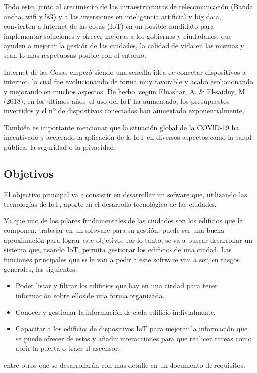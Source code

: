 \documentclass[12pt, a4paper, twoside]{article}
\begin{document}
Todo esto, junto al crecimiento de las infraestructuras de telecomuncación (Banda ancha, wifi y 5G)
y a las inversiones en inteligencia artificial y big data, convierten  a Internet de las cosas (IoT)
 en un posible candidato para implementar soluciones y ofrecer mejoras a los gobiernos y ciudadanos, 
que ayuden a mejorar la gestión de las ciudades, la calidad de vida en las mismas y 
sean lo más respetuosas posible con el entorno.

Internet de las Cosas empezó siendo una sencilla idea de conectar dispositivos a
internet, la cual fue evolucionando de forma muy favorable y acabó evolucionando y 
mejorando en muchos aspectos. De hecho, según Elnashar, A. \& El-saidny, M. (2018),
en los últimos años, el uso del IoT ha aumentado, los presupuestos 
invertidos y el nº de dispositivos conectados han aumentado exponencialmente,

También es importante mencionar que la situación global de la COVID-19 ha incentivado
y acelerado la aplicación de la IoT en diversos aspectos como la salud pública,
la seguridad o la privacidad.

\subsection{Objetivos}
El objectivo principal va a consistir en desarrollar un sofware que, 
utilizando las tecnologías de IoT, aporte en el desarrollo tecnológico de las ciudades. 

Ya que uno de los pilares fundamentales de las ciudades son los edificios
que la componen, trabajar en un software para su gestión,
puede ser una buena aproximación para lograr este objetivo, por lo tanto, 
se va a buscar desarrollar un sistema que, usando IoT, permita gestionar
los edificios de una ciudad. Las funciones principales que se le van a pedir a 
este software van a ser, en rasgos generales, las siguientes:
\begin{itemize}
  \item Poder listar y filtrar los edificios que hay en una ciudad para tener información sobre ellos
        de una forma organizada.
  \item Conocer y gestionar la información de cada edificio indivialmente.
  \item Capacitar a los edificios de dispositivos IoT para mejorar la información que se puede ofrecer
        de estos y añadir interacciones para que realicen tareas como abrir la puerta o traer al 
        ascensor.
\end{itemize}
entre otros que se desarrollarán con más detalle en un documento de requisitos.
\end{document}
